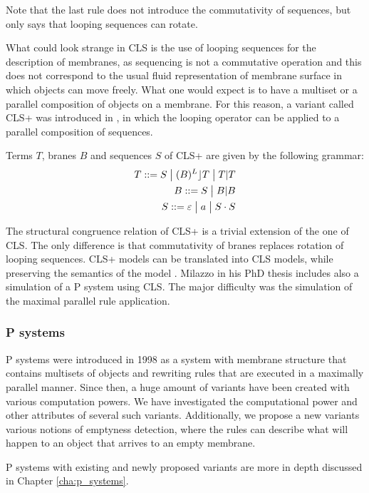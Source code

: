 Note that the last rule does not introduce the commutativity of sequences, but only says that looping sequences can rotate.

What could look strange in CLS is the use of looping sequences for the description of membranes, as sequencing is not a commutative operation and this does not correspond to the usual fluid representation of membrane surface in which objects can move freely. What one would expect is to have a multiset or a parallel composition of objects on a membrane. For this reason, a variant called CLS+ was introduced in \cite{Milazzo07CLS}, in which the looping operator can be applied
to a parallel composition of sequences.

\begin{definition}
  Terms $T$, branes $B$ and sequences $S$ of CLS+ are given by the following grammar:
  \begin{align*}
    T ::= S \;\big|\; (B)^L\rfloor T \;\big|\; T|T\\
    B ::= S \;\big|\; B|B\\
    S ::= \varepsilon \;\big|\; a \;\big|\; S\cdot S
  \end{align*}
\end{definition}

The structural congruence relation of CLS+ is a trivial extension of the one of CLS. The only difference is that commutativity of branes replaces rotation of looping sequences. CLS+ models can be translated into CLS models, while preserving the semantics of the model \cite{Barbuti07CLS}. Milazzo in his PhD thesis \cite{Milazzo07CLS} includes also a simulation of a P system using CLS. The major difficulty was the simulation of the maximal parallel rule application.



\subsubsection{P systems} %
\label{subs:p_systems}

 P systems \cite{Paun98} were introduced in 1998 as a system with membrane structure that contains multisets of objects and rewriting rules that are executed in a maximally parallel manner. Since then, a huge amount of variants have been created with various computation powers. We have investigated the computational power and other attributes of several such variants. Additionally, we propose a new variants various notions of emptyness detection, where the rules can describe what will happen to an object that arrives to an empty membrane.

P systems with existing and newly proposed variants are more in depth discussed in Chapter \ref{cha:p_systems}.



